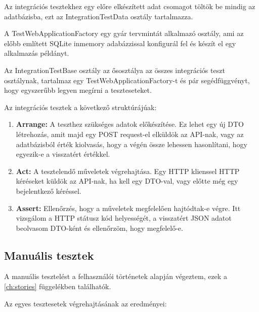 Az integrációs tesztekhez egy előre elkészített adat csomagot töltök be mindig az adatbázisba, ezt az IntegrationTestData osztály tartalmazza.

A TestWebApplicationFactory egy gyár tervmintát alkalmazó osztály, ami az előbb említett SQLite inmemory adabázzissal konfigurál fel és készít el egy alkalmazás példányt.

Az IntegrationTestBase osztály az ősosztálya az összes integrációs teszt osztálynak, tartalmaz egy TestWebApplicationFactory-t és pár segédfüggvényt, hogy egyszerűbb legyen megírni a teszteseteket.

Az integrációs tesztek a következő struktúrájúak:
\begin{enumerate}
	\item \textbf{Arrange:} A teszthez szükséges adatok előkészítése. Ez lehet egy új DTO létrehozás, amit majd egy POST request-el elküldök az API-nak, vagy az adatbázisból érték kiolvasás, hogy a végén össze lehessen hasonlítani, hogy egyezik-e a visszatért értékkel.
	\item \textbf{Act:} A tesztelendő műveletek végrehajtása. Egy HTTP klienssel HTTP kéréseket küldök az API-nak, ha kell egy DTO-val, vagy előtte még egy bejelentkező kéréssel.
	\item \textbf{Assert:} Ellenőrzés, hogy a műveletek megfelelően hajtódtak-e végre. Itt vizsgálom a HTTP státusz kód helyességét, a visszatért JSON adatot beolvasom DTO-ként és ellenőrzöm, hogy megfelelő-e.
\end{enumerate}

\clearpage

\subsection{Manuális tesztek}

A manuális tesztelést a felhasználói történetek alapján végeztem, ezek a \ref{ch:stories} függelékben találhatók.

Az egyes tesztesetek végrehajtásának az eredményei:

